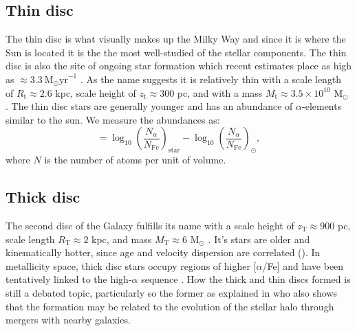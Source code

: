 \subsection{Thin disc}\label{subsec:components-thindisc}
The thin disc is what visually makes up the Milky Way and since it is where the Sun is located it is the the most well-studied of the stellar components. The thin disc is also the site of ongoing star formation which recent estimates place as high as $\approx 3.3\ \mathrm{M_\odot yr}^{-1}$ \citep{zari:22}. As the name suggests it is relatively thin with a scale length of $R_\mathrm{t} \approx 2.6$ kpc, scale height of $z_\mathrm{t} \approx 300$ pc, and with a mass $M_\mathrm{t} \approx 3.5\times 10^10$ M$_\odot$ \citep{bland-hawthorn:16}. The thin disc stars are generally younger and has an abundance of $\alpha$-elements similar to the sun. We measure the abundances as:
\begin{equation}
    [\alpha/\mathrm{Fe}] = \log_{10}\left(\frac{N_\alpha}{N_\mathrm{Fe}}\right)_\mathrm{star} - \log_{10}\left(\frac{N_\alpha}{N_\mathrm{Fe}}\right)_\odot,
\end{equation}
where $N$ is the number of atoms per unit of volume.

\subsection{Thick disc}\label{subsec:components-thickdisc}
The second disc of the Galaxy fulfills its name with a scale height of $z_\mathrm{T}\approx 900$ pc, scale length $R_\mathrm{T} \approx 2$ kpc, and mass $M_\mathrm{T} \approx 6$ M$_\odot$ \citep{bland-hawthorn:16}. It's stars are older \citep{martig:16} and kinematically hotter, since age and velocity dispersion are correlated (\citealt{martig:14,aumer:16}). In metallicity space, thick disc stars occupy regions of higher [$\alpha$/Fe] and have been tentatively linked to the high-$\alpha$ sequence \citep{katz:21}. How the thick and thin discs formed is still a debated topic, particularly so the former as explained in \cite{helmi:20} who also shows that the formation may be related to the evolution of the stellar halo through mergers with nearby galaxies. 

